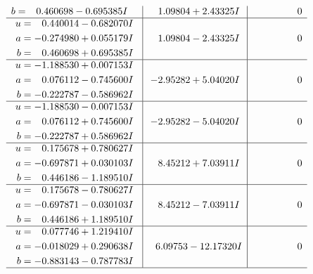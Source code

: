 \documentclass[1p]{elsarticle_modified}
\theoremstyle{definition}
\begin{document}
$$\begin{array}{c|c|c}
\begin{aligned}
b &= \phantom{-}0.460698 - 0.695385 I\end{aligned}
 & \phantom{-}1.09804 + 2.43325 I & \phantom{-0.000000 } 0 \\ \hline\begin{aligned}
u &= \phantom{-}0.440014 - 0.682070 I \\
a &= -0.274980 + 0.055179 I \\
b &= \phantom{-}0.460698 + 0.695385 I\end{aligned}
 & \phantom{-}1.09804 - 2.43325 I & \phantom{-0.000000 } 0 \\ \hline\begin{aligned}
u &= -1.188530 + 0.007153 I \\
a &= \phantom{-}0.076112 - 0.745600 I \\
b &= -0.222787 - 0.586962 I\end{aligned}
 & -2.95282 + 5.04020 I & \phantom{-0.000000 } 0 \\ \hline\begin{aligned}
u &= -1.188530 - 0.007153 I \\
a &= \phantom{-}0.076112 + 0.745600 I \\
b &= -0.222787 + 0.586962 I\end{aligned}
 & -2.95282 - 5.04020 I & \phantom{-0.000000 } 0 \\ \hline\begin{aligned}
u &= \phantom{-}0.175678 + 0.780627 I \\
a &= -0.697871 + 0.030103 I \\
b &= \phantom{-}0.446186 - 1.189510 I\end{aligned}
 & \phantom{-}8.45212 + 7.03911 I & \phantom{-0.000000 } 0 \\ \hline\begin{aligned}
u &= \phantom{-}0.175678 - 0.780627 I \\
a &= -0.697871 - 0.030103 I \\
b &= \phantom{-}0.446186 + 1.189510 I\end{aligned}
 & \phantom{-}8.45212 - 7.03911 I & \phantom{-0.000000 } 0 \\ \hline\begin{aligned}
u &= \phantom{-}0.077746 + 1.219410 I \\
a &= -0.018029 + 0.290638 I \\
b &= -0.883143 - 0.787783 I\end{aligned}
 & \phantom{-}6.09753 - 12.17320 I & \phantom{-0.000000 } 0\\
 \hline 
 \end{array}$$\newpage$$\begin{array}{c|c|c}  

\end{array}$$
\end{document}
